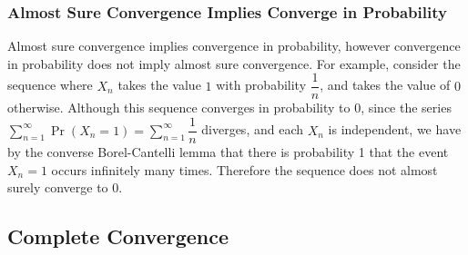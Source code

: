 \documentclass[11pt]{report} %
\begin{document}
\subsubsection{Almost Sure Convergence Implies Converge in Probability}

Almost sure convergence implies convergence in probability, however convergence in probability does not imply almost sure convergence. For example, consider the sequence where $X_{n}$ takes the value $1$ with probability $\dfrac{1}{n}$, and takes the value of $0$ otherwise. Although this sequence converges in probability to $0$, since the series $\sum_{n = 1}^{\infty}\operatorname{Pr}\left(X_{n} = 1\right) = \sum_{n = 1}^{\infty}\dfrac{1}{n}$ diverges, and each $X_{n}$ is independent, we have by the converse Borel-Cantelli lemma that there is probability 1 that the event $X_{n} = 1$ occurs infinitely many times. Therefore the sequence does not almost surely converge to $0$.

\subsection{Complete Convergence}
\end{document}
